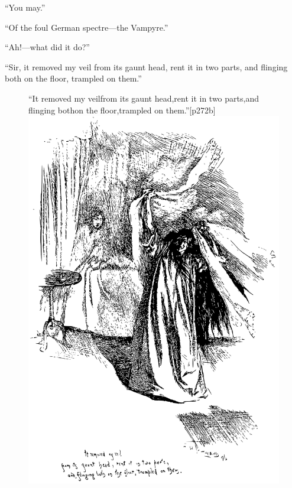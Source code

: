 \enquote{You may.}

\enquote{Of the foul German spectre---the Vampyre.}

\enquote{Ah!---what did it do?}

\enquote{Sir, it removed my veil from its gaunt head, rent it in two
	parts, and flinging both on the floor, trampled on them.}

\begin{figure}
	\begin{sidecaption}{\enquote{It removed my veil\linebreak from its gaunt head,\linebreak rent it in two parts,\linebreak and flinging both\linebreak on the floor,\linebreak trampled on them.}}[p272b]
		\centering
		\includegraphics[width=\linewidth]{images/p272b.pdf}
	\end{sidecaption}
\end{figure}

